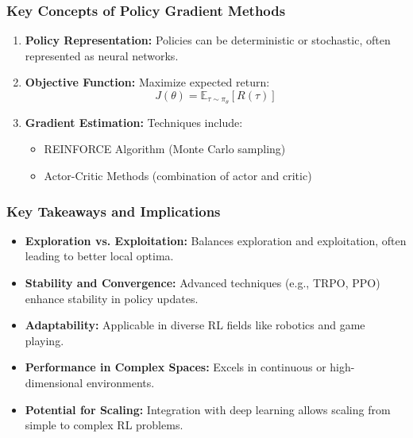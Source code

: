 \documentclass[aspectratio=169]{beamer}
\begin{document}
\begin{frame}[fragile]
    \frametitle{Key Concepts of Policy Gradient Methods}
    \begin{enumerate}
        \item \textbf{Policy Representation:} Policies can be deterministic or stochastic, often represented as neural networks.
        
        \item \textbf{Objective Function:} Maximize expected return:
        \begin{equation}
            J(\theta) = \mathbb{E}_{\tau \sim \pi_\theta} [R(\tau)]
        \end{equation}
        
        \item \textbf{Gradient Estimation:} Techniques include:
        \begin{itemize}
            \item REINFORCE Algorithm (Monte Carlo sampling)
            \item Actor-Critic Methods (combination of actor and critic)
        \end{itemize}
    \end{enumerate}
\end{frame}

\begin{frame}[fragile]
    \frametitle{Key Takeaways and Implications}
    \begin{itemize}
        \item \textbf{Exploration vs. Exploitation:} Balances exploration and exploitation, often leading to better local optima.
        
        \item \textbf{Stability and Convergence:} Advanced techniques (e.g., TRPO, PPO) enhance stability in policy updates.
        
        \item \textbf{Adaptability:} Applicable in diverse RL fields like robotics and game playing.
        
        \item \textbf{Performance in Complex Spaces:} Excels in continuous or high-dimensional environments.
        
        \item \textbf{Potential for Scaling:} Integration with deep learning allows scaling from simple to complex RL problems.
    \end{itemize}
\end{frame}
\end{document}
